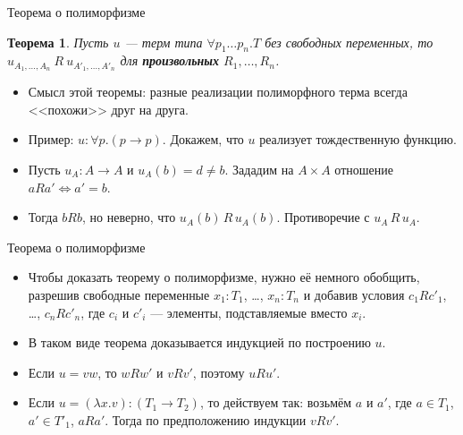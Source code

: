 \documentclass[xcolor=dvipsnames]{beamer}
\newtheorem{theoremr}{Теорема}
\begin{document}
\begin{frame}{Теорема о полиморфизме}
 
 \begin{theoremr}
  Пусть $u$ --- терм типа $\forall p_1 \ldots p_n . T$ без свободных переменных, то $u_{A_1, \ldots, A_n} \: R \:
  u_{A'_1, \ldots, A'_n}$ для {\bfseries\itshape произвольных} $R_1, \ldots, R_n$.
 \end{theoremr}
\begin{itemize}
 \item<2-> Смысл этой теоремы: разные реализации полиморфного терма всегда <<похожи>> друг на друга.
 \item<3-> Пример: $u \colon \forall p. (p \to p)$. Докажем, что $u$ реализует тождественную функцию. 
 \item<4-> Пусть $u_A \colon A \to A$ и $u_A(b) = d \ne b$. Зададим на $A \times A$ отношение $a R a' \iff a' = b$.
 \item<5-> Тогда $b R b$, но неверно, что $u_A(b) \,R \,u_A (b)$. Противоречие с $u_A \, R \, u_A$. 
\end{itemize}


\end{frame}

\begin{frame}{Теорема о полиморфизме}
 
 \begin{itemize}[<+->]
  \item Чтобы доказать теорему о полиморфизме, нужно её немного обобщить, разрешив свободные переменные $x_1 : T_1$, \ldots, $x_n : T_n$ и добавив условия $c_1 R c'_1$, \ldots, $c_n R c'_n$, где $c_i$ и $c'_i$ --- элементы, подставляемые вместо $x_i$.
  \item В таком виде теорема доказывается индукцией по построению $u$.
  \item Если $u = vw$, то $w R w'$ и $v R v'$, поэтому $u R u'$.
  \item Если $u = (\lambda x . v) : (T_1 \to T_2)$, то действуем так: возьмём $a$ и $a'$, где $a \in T_1$, $a' \in T'_1$, $a R a'$. Тогда по предположению индукции $v R v'$.
 \end{itemize}

\end{frame}
\end{document}
